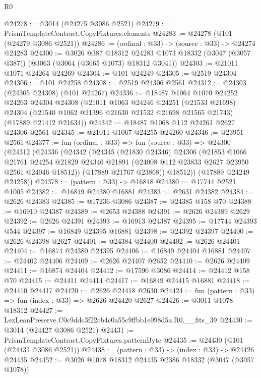 \begin{lexlean}{R0}
\begin{coremodule}
@24278 := @3014 (@24275 @3086 @2521)
@24279 := PrismTemplateContract.CopyFixtures.elements
@24283 := @24278 (@101 (@24279 @3086 @2521))
@24286 := (ordinal : @33) -> (source : @33) -> @24274 @24283
@24300 := @3026
    @387
    @18312
    @24283
    @1073
    @18332
    (@3047 (@3057 @387))
    (@3063 (@3064 (@3065 @1073) @18312 @3041))
@24303 := @21011 @1071 @24264 @24269
@24304 := @101 @24249
@24305 := @2519 @24304
@24306 := @101 @24258
@24308 := @2519 @24306 @2561
@24312 := @24303 (@24305 @24308) (@101 @24267)
@24336 := @18487
    @1064
    @1070
    @24252
    @24263
    @24304
    @24308
    (@21011
      @1063
      @24246
      @24251
      (@21533 @21698)
      @24304
      (@21540 @1062 @21396 @21630 @21532 @21698 @21565 @21743)
      (@17889 @21412 @21634))
@24342 := @18487 @1068 @112 @24261 @2627 @24306 @2561
@24345 := @21011 @1067 @24255 @24260
@24346 := @23951 @2561
@24377 := fun (ordinal : @33) =>
  fun (source : @33) =>
  @24300
    (@24312
      (@24336
        (@24342
          (@24345
            (@21830 @24346)
            @24306
            (@21853
              @1066
              @21761
              @24254
              @21829
              @24346
              @21891
              (@24008 @112 @23833 @2627 @23950 @2561 @24046 @18512))
            (@17889 @21767 @23868))
          @18512))
      (@17889 @24249 @24258))
@24378 := (pattern : @33) -> @16848
@24380 := @17744 @2521 @1005
@24382 := @16849 @24380 @16881
@24383 := @2631 @24382
@24384 := @2626 @24383
@24385 := @17236 @3086
@24387 := @24385 @158 @70
@24388 := @16910 @24387
@24389 := @2653 @24388
@24391 := @2626 @24389 @2629
@24392 := @2626 @24391
@24393 := @16913 @24387
@24395 := @17744 @24393 @544
@24397 := @16849 @24395 @16881
@24398 := @24392 @24397
@24400 := @2626 @24398 @2627
@24401 := @24384 @24400
@24402 := @2626 @24401
@24404 := @16874 @24380 @24395
@24406 := @16849 @24404 @16881
@24407 := @24402 @24406
@24409 := @2626 @24407 @2652
@24410 := @2626 @24409
@24411 := @16874 @24404
@24412 := @17590 @3086
@24414 := @24412 @158 @70
@24415 := @24411 @24414
@24417 := @16849 @24415 @16881
@24418 := @24410 @24417
@24420 := @2626 @24418 @2630
@24424 := fun (pattern : @33) => fun (index : @33) => @2626 @24420 @2627
@24426 := @3011 @1078 @18312
@24427 := LexLeanPreserve.C0c9ddc3f22cb4c0a55c9ffbb1e098d5a.R0.__fits_39
@24430 := @3014 (@24427 @3086 @2521)
@24431 := PrismTemplateContract.CopyFixtures.patternByte
@24435 := @24430 (@101 (@24431 @3086 @2521))
@24438 := (pattern : @33) -> (index : @33) -> @24426 @24435
@24452 := @3026
    @1078
    @18312
    @24435
    @2386
    @18332
    (@3047 (@3057 @1078))

\end{coremodule}
\end{lexlean}
